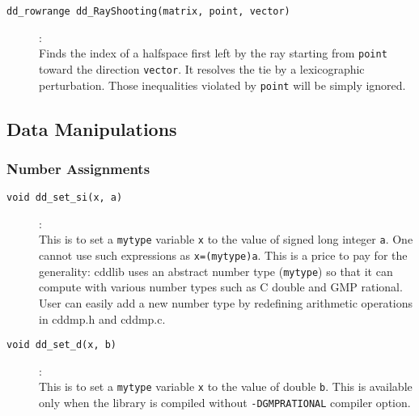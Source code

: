 \documentclass[11pt]{article}
\newcommand {\0} {{\bf 0}}
\begin{document}
\begin{description}
\item[{\tt dd\_rowrange dd\_RayShooting(matrix, point, vector)}]:\\
Finds the index of a halfspace first left by the ray starting from
{\tt point} toward the direction {\tt vector}.  It resolves
the tie by a lexicographic perturbation.  Those inequalities violated
by {\tt point} will be simply ignored.

\end{description}


\subsection{Data Manipulations}  \label{DataLibrary}

\subsubsection{Number Assignments}
\begin{description}

\item[{\tt void dd\_set\_si(x, a)}]:\\
This is to set a {\tt mytype} variable {\tt x} to the
value of signed long integer {\tt a}.  One
 cannot use such expressions as {\tt x=(mytype)a}.
This is a price to pay for the generality:
cddlib uses an abstract number type ({\tt mytype}) 
so that it can compute with various 
number types such as C double and GMP rational.
User can easily add a new number type by redefining
arithmetic operations in cddmp.h and cddmp.c.

\item[{\tt void dd\_set\_d(x, b)}]:\\
This is to set a {\tt mytype} variable {\tt x} to the
value of double {\tt b}.  This is available only
when the library is compiled without {\tt -DGMPRATIONAL}
compiler option.

\end{description}
\end{document}
